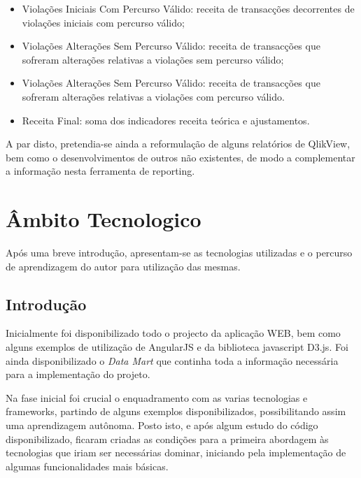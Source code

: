 \begin{itemize}
\begin{itemize}
	\item Violações Iniciais Com Percurso Válido: receita de transacções decorrentes de violações iniciais com percurso válido;
	\item Violações Alterações Sem Percurso Válido: receita de transacções que sofreram alterações relativas a violações sem percurso válido;
	\item Violações Alterações Sem Percurso Válido: receita de transacções que sofreram alterações relativas a violações com percurso válido.
	\item Receita Final: soma dos indicadores receita teórica e ajustamentos.
	\end{itemize}
\end{itemize}
   
\par A par disto, pretendia-se ainda a reformulação de alguns relatórios de QlikView,  bem como o desenvolvimentos de outros não existentes, de modo a complementar a informação nesta ferramenta de reporting.

\section{Âmbito Tecnologico}
\par Após uma breve introdução, apresentam-se as tecnologias utilizadas e o percurso de aprendizagem do autor para utilização das mesmas.

\subsection{Introdução}
\par Inicialmente foi disponibilizado todo o projecto da aplicação WEB, bem como alguns exemplos de utilização de AngularJS e da biblioteca javascript D3.js. Foi ainda disponibilizado o \textit{Data Mart} que continha toda a informação necessária para a implementação do projeto. 
\par Na fase inicial foi crucial o enquadramento com as varias tecnologias e frameworks, partindo de alguns exemplos disponibilizados, possibilitando assim uma aprendizagem autônoma. Posto isto, e após algum estudo do código disponibilizado,  ficaram criadas as condições para a primeira abordagem às tecnologias que iriam ser necessárias dominar, iniciando pela implementação de algumas funcionalidades mais básicas. 

